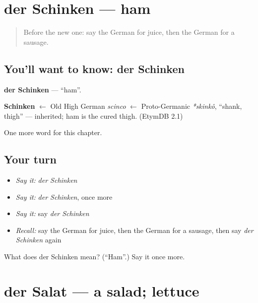 \section[der Schinken]{der Schinken — ham}

\label{lesson:GE-C74-schinken}



\begin{quote}
Before the new one: say the German for juice, then the German for a sausage.
\end{quote}

\subsection*{You'll want to know: der Schinken}
\textbf{der Schinken} — \textquotedblleft{}ham\textquotedblright{}.

\begin{cousinweb}
\textbf{Schinken} $\leftarrow$ Old High German \emph{scinco} $\leftarrow$ Proto-Germanic \emph{*skinkô}, \textquotedblleft{}shank, thigh\textquotedblright{} — inherited; ham is the cured thigh. (EtymDB 2.1)
\end{cousinweb}

\begin{grammarlens}[title={What you've built}]
One more word for this chapter.
\end{grammarlens}

\subsection*{Your turn}
\begin{itemize}
\raggedright
  \item \emph{Say it:} \emph{der Schinken}
  \item \emph{Say it:} \emph{der Schinken}, once more
  \item \emph{Say it:} say \emph{der Schinken}
  \item \emph{Recall:} say the German for juice, then the German for a sausage, then say \emph{der Schinken} again
\end{itemize}

\begin{tcolorbox}[breakable,colback=teal!4,colframe=teal!35!black,title={Before you move on}]
What does der Schinken mean? (\textquotedblleft{}Ham\textquotedblright{}.) Say it once more.
\end{tcolorbox}
\section[der Salat]{der Salat — a salad; lettuce}

